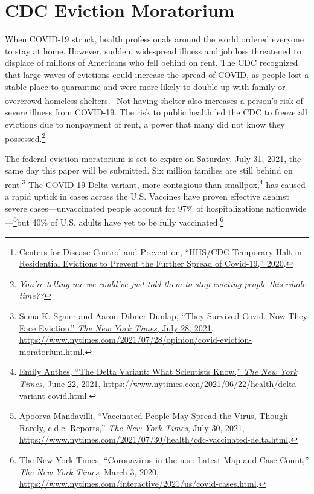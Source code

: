 \documentclass[
  openany]{book}
\begin{document}
\hypertarget{cdc-eviction-moratorium}{%
\section{CDC Eviction Moratorium}\label{cdc-eviction-moratorium}}

When COVID-19 struck, health professionals around the world ordered everyone to stay at home. However, sudden, widespread illness and job loss threatened to displace of millions of Americans who fell behind on rent. The CDC recognized that large waves of evictions could increase the spread of COVID, as people lost a stable place to quarantine and were more likely to double up with family or overcrowd homeless shelters.\footnote{\protect\hyperlink{ref-cdc2020a}{Centers for Disease Control and Prevention, {``HHS/CDC Temporary Halt in Residential Evictions to Prevent the Further Spread of Covid-19,''} 2020}.} Not having shelter also increases a person's risk of severe illness from COVID-19. The risk to public health led the CDC to freeze all evictions due to nonpayment of rent, a power that many did not know they possessed.\footnote{\emph{You're telling me we could've just told them to stop evicting people this whole time??}}

The federal eviction moratorium is set to expire on Saturday, July 31, 2021, the same day this paper will be submitted. Six million families are still behind on rent.\footnote{\protect\hyperlink{ref-sgaier2021}{Sema K. Sgaier and Aaron Dibner-Dunlap, {``They Survived Covid. Now They Face Eviction.''} \emph{The New York Times}, July 28, 2021, \url{https://www.nytimes.com/2021/07/28/opinion/covid-eviction-moratorium.html}}.} The COVID-19 Delta variant, more contagious than smallpox,\footnote{\protect\hyperlink{ref-anthes2021}{Emily Anthes, {``The Delta Variant: What Scientists Know,''} \emph{The New York Times}, June 22, 2021, \url{https://www.nytimes.com/2021/06/22/health/delta-variant-covid.html}}.} has caused a rapid uptick in cases across the U.S. Vaccines have proven effective against severe cases---unvaccinated people account for 97\% of hospitalizations nationwide---\footnote{\protect\hyperlink{ref-mandavilli2021}{Apoorva Mandavilli, {``Vaccinated People May Spread the Virus, Though Rarely, c.d.c. Reports,''} \emph{The New York Times}, July 30, 2021, \url{https://www.nytimes.com/2021/07/30/health/cdc-vaccinated-delta.html}}.}but 40\% of U.S. adults have yet to be fully vaccinated.\footnote{\protect\hyperlink{ref-thenewyorktimes2020}{The New York Times, {``Coronavirus in the u.s.: Latest Map and Case Count,''} \emph{The New York Times}, March 3, 2020, \url{https://www.nytimes.com/interactive/2021/us/covid-cases.html}}.}
\end{document}

